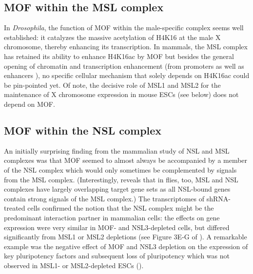 \subsection{MOF within the MSL complex}
In \textit{Drosophila}, the function of MOF within the male-specific complex seems well established: it catalyzes the massive acetylation of H4K16 at the male X chromosome, thereby enhancing its transcription. In mammals, the MSL complex has retained its ability to enhance H4K16ac by MOF but besides the general opening of chromatin and transcription enhancement (from promoters as well as enhancers \citep{Taylor2013}), no specific cellular mechanism that solely depends on H4K16ac could be pin-pointed yet. Of note, the decisive role of MSL1 and MSL2 for the maintenance of X chromosome expression in mouse ESCs (see below) does not depend on MOF.
%
\subsection{MOF within the NSL complex}
An initially surprising finding from the mammalian study of NSL and MSL complexes was that MOF seemed to almost always be accompanied by a member of the NSL complex which would only sometimes be complemented by signals from the MSL complex. (Interestingly,  reveals that in flies, too, MSL and NSL complexes have largely overlapping target gene sets as all NSL-bound genes contain strong signals of the MSL complex.) The transcriptomes of shRNA-treated cells confirmed the notion that the NSL complex might be the predominant interaction partner in mammalian cells: the effects on gene expression were very similar in MOF- and NSL3-depleted cells, but differed significantly from MSL1 or MSL2 depletions (see Figure 3E-G of ). A remarkable example was the negative effect of MOF and NSL3 depletion on the expression of key pluripotency factors and subsequent loss of pluripotency which was not observed in MSL1- or MSL2-depleted ESCs ().

